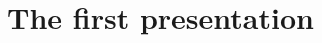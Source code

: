 \documentclass[hott-all.tex]{subfiles}
\begin{document}
\section{The first presentation}
\label{sec:syntax-informally}
%
%
%
%
\end{document}
